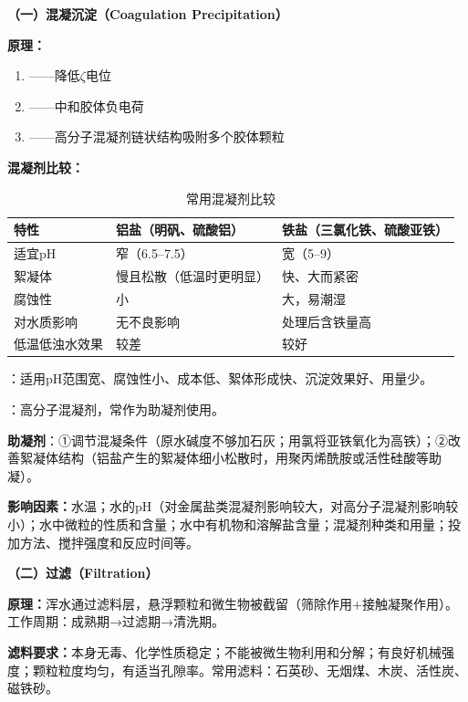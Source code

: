 \begin{keybox}
\textbf{（一）混凝沉淀（Coagulation Precipitation）}

\textbf{原理：}
\begin{enumerate}[leftmargin=*]
    \item {}——降低$\zeta$电位
    \item {}——中和胶体负电荷
    \item {}——高分子混凝剂链状结构吸附多个胶体颗粒
\end{enumerate}

\textbf{混凝剂比较：}

\begin{table}[H]
\centering
\caption{常用混凝剂比较}
\begin{tabularx}{\textwidth}{lXX}
\hline
\textbf{特性} & \textbf{铝盐（明矾、硫酸铝）} & \textbf{铁盐（三氯化铁、硫酸亚铁）} \\
\hline
适宜pH & 窄（6.5--7.5） & 宽（5--9） \\
絮凝体 & 慢且松散（低温时更明显） & 快、大而紧密 \\
腐蚀性 & 小 & 大，易潮湿 \\
对水质影响 & 无不良影响 & 处理后含铁量高 \\
低温低浊水效果 & 较差 & 较好 \\
\hline
\end{tabularx}
\end{table}

：适用pH范围宽、腐蚀性小、成本低、絮体形成快、沉淀效果好、用量少。

：高分子混凝剂，常作为助凝剂使用。

\textbf{助凝剂}：①调节混凝条件（原水碱度不够加石灰；用氯将亚铁氧化为高铁）；②改善絮凝体结构（铝盐产生的絮凝体细小松散时，用聚丙烯酰胺或活性硅酸等助凝）。

\textbf{影响因素：}水温；水的pH（对金属盐类混凝剂影响较大，对高分子混凝剂影响较小）；水中微粒的性质和含量；水中有机物和溶解盐含量；混凝剂种类和用量；投加方法、搅拌强度和反应时间等。

\textbf{（二）过滤（Filtration）}

\textbf{原理：}浑水通过滤料层，悬浮颗粒和微生物被截留（筛除作用+接触凝聚作用）。工作周期：成熟期→过滤期→清洗期。

\textbf{滤料要求：}本身无毒、化学性质稳定；不能被微生物利用和分解；有良好机械强度；颗粒粒度均匀，有适当孔隙率。常用滤料：石英砂、无烟煤、木炭、活性炭、磁铁砂。


\end{keybox}
